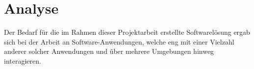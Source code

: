 \section{Analyse}
\paragraph{}
Der Bedarf für die im Rahmen dieser Projektarbeit erstellte Softwarelösung ergab
sich bei der Arbeit an Software-Anwendungen, welche eng mit einer Vielzahl
anderer solcher Anwendungen und über mehrere Umgebungen hinweg interagieren.



